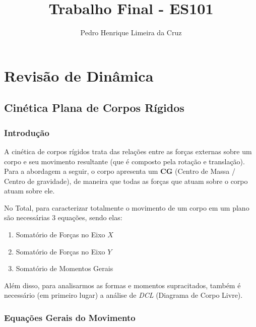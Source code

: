 \documentclass{article}
\author{Pedro Henrique Limeira da Cruz}
\title{Trabalho Final - ES101}
\begin{document}
\maketitle
\thispagestyle{empty}


\newpage

\section[Rev. Dinâmica]{Revisão de Dinâmica}

\subsection{Cinética Plana de Corpos Rígidos}

\subsubsection[Intro]{Introdução}
A cinética de corpos rígidos trata das relações entre as forças externas sobre um corpo e seu movimento resultante (que é composto pela rotação e translação). Para a abordagem a seguir, o
corpo apresenta um \textbf{CG} (Centro de Massa / Centro de gravidade), de maneira que todas as forças que atuam sobre o corpo atuam sobre ele.

No Total, para caracterizar totalmente o movimento de um corpo em um plano são necessárias 3 equações, sendo elas:
\begin{enumerate}
    \item Somatório de Forças no Eixo $X$
    \item Somatório de Forças no Eixo $Y$
    \item Somatório de Momentos Gerais
\end{enumerate}

Além disso, para analisarmos as formas e momentos supracitados, também é necessário (em primeiro lugar) a análise de \emph{DCL} (Diagrama de Corpo Livre).

\subsubsection[Eq. Gerais do Mov.]{Equações Gerais do Movimento}
\end{document}

